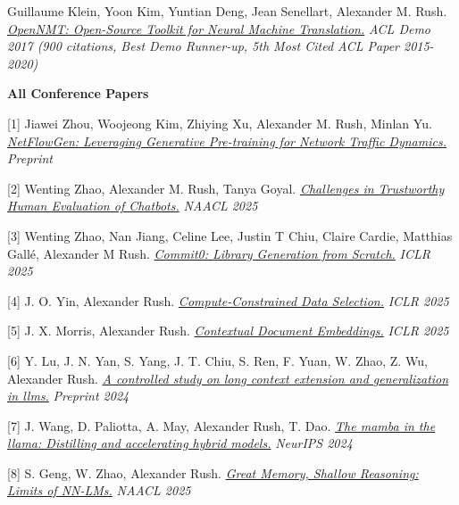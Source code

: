 \documentclass[10pt]{article}
\begin{document}
\medskip
\ind Guillaume Klein, Yoon Kim, Yuntian Deng, Jean Senellart, Alexander M. Rush. \emph{\href{ https://arxiv.org/abs/1701.02810 }{ OpenNMT: Open-Source Toolkit for Neural Machine Translation.} }\emph{ ACL Demo 2017 (900 citations, Best Demo Runner-up, 5th Most Cited ACL Paper 2015-2020) }

\medskip

\noindent\textbf{All Conference Papers \vspace{0.01in}}


[1] \ind Jiawei Zhou, Woojeong Kim, Zhiying Xu, Alexander M. Rush, Minlan Yu. \emph{\href{ https://arxiv.org/abs/2412.20635 }{ NetFlowGen: Leveraging Generative Pre-training for Network Traffic Dynamics.} }\emph{ Preprint }

\medskip


[2] \ind Wenting Zhao, Alexander M. Rush, Tanya Goyal. \emph{\href{ https://arxiv.org/abs/2412.04363 }{ Challenges in Trustworthy Human Evaluation of Chatbots.} }\emph{ NAACL 2025 }

\medskip


[3] \ind Wenting Zhao, Nan Jiang, Celine Lee, Justin T Chiu, Claire Cardie, Matthias Gallé, Alexander M Rush. \emph{\href{ https://arxiv.org/abs/2412.01769 }{ Commit0: Library Generation from Scratch.} }\emph{ ICLR 2025 }

\medskip


[4] \ind J. O. Yin, Alexander Rush. \emph{\href{ https://arxiv.org/abs/2410.16208 }{ Compute-Constrained Data Selection.} }\emph{ ICLR 2025 }

\medskip


[5] \ind J. X. Morris, Alexander Rush. \emph{\href{ https://arxiv.org/abs/2410.02525 }{ Contextual Document Embeddings.} }\emph{ ICLR 2025 }

\medskip


[6] \ind Y. Lu, J. N. Yan, S. Yang, J. T. Chiu, S. Ren, F. Yuan, W. Zhao, Z. Wu, Alexander Rush. \emph{\href{ https://arxiv.org/abs/2409.12181 }{ A controlled study on long context extension and generalization in llms.} }\emph{ Preprint 2024 }

\medskip


[7] \ind J. Wang, D. Paliotta, A. May, Alexander Rush, T. Dao. \emph{\href{ https://arxiv.org/abs/2408.15237 }{ The mamba in the llama: Distilling and accelerating hybrid models.} }\emph{ NeurIPS 2024 }

\medskip


[8] \ind S. Geng, W. Zhao, Alexander Rush. \emph{\href{ https://arxiv.org/abs/2408.11815 }{ Great Memory, Shallow Reasoning: Limits of NN-LMs.} }\emph{ NAACL 2025 }
\end{document}
